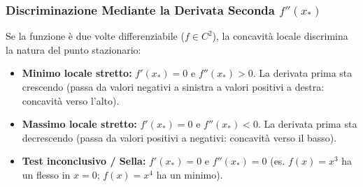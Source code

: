 \subsubsection{Discriminazione Mediante la Derivata Seconda $f''(x_*)$}
Se la funzione \`e due volte differenziabile ($f \in C^2$), la concavit\`a locale discrimina la natura del punto stazionario:
\begin{itemize}
    \item \textbf{Minimo locale stretto:} $f'(x_*) = 0$ e $f''(x_*) > 0$. La derivata prima sta crescendo (passa da valori negativi a sinistra a valori positivi a destra: concavit\`a verso l'alto).
    \item \textbf{Massimo locale stretto:} $f'(x_*) = 0$ e $f''(x_*) < 0$. La derivata prima sta decrescendo (passa da valori positivi a negativi: concavit\`a verso il basso).
    \item \textbf{Test inconclusivo / Sella:} $f'(x_*) = 0$ e $f''(x_*) = 0$ (es. $f(x) = x^3$ ha un flesso in $x=0$; $f(x) = x^4$ ha un minimo).
\end{itemize}


